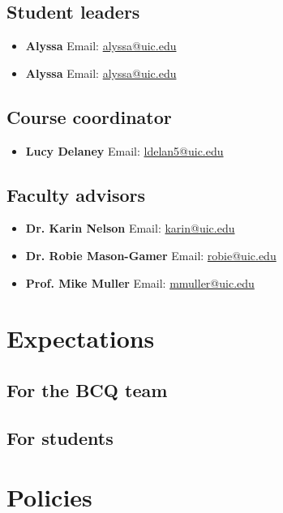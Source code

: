 \documentclass[]{article}
\begin{document}
\begin{multicols*}{2}

  \subsection{Student leaders}

  \begin{itemize}[label=$\mathwitch*$]
    \item{\textbf{Alyssa} \hspace{1mm} Email: \url{alyssa@uic.edu}}
   \item{\textbf{Alyssa} \hspace{1mm} Email: \url{alyssa@uic.edu}}
    \end{itemize}

\subsection{Course coordinator}
    
    \begin{itemize}[label=$\mathwitch*$]
    \item{\textbf{Lucy Delaney} \hspace{1mm} Email: \url{ldelan5@uic.edu}}
    \end{itemize}


  \end{multicols*}   


    \subsection{Faculty advisors}
    
    \begin{itemize}[label=$\mathwitch*$]
    \item{\textbf{Dr. Karin Nelson} \hspace{1mm} Email: \url{karin@uic.edu}}
    \item{\textbf{Dr. Robie Mason-Gamer} \hspace{1mm} Email: \url{robie@uic.edu}}
    \item{\textbf{Prof. Mike Muller} \hspace{1mm} Email: \url{mmuller@uic.edu}}
    \end{itemize}
  


\section{Expectations}

\subsection{For the BCQ team}

\subsection{For students}

\section{Policies}
\end{document}

